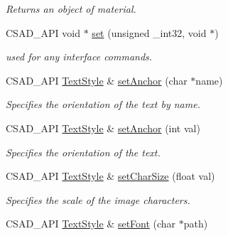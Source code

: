 \begin{DoxyCompactItemize}
\begin{DoxyCompactList}\small\item\em Returns an object of material. \end{DoxyCompactList}\item 
\hypertarget{classcsad_1_1_text_style_aa1f96fcb68ee340eed28c795fd7b0fdd}{C\-S\-A\-D\-\_\-\-A\-P\-I void $\ast$ \hyperlink{classcsad_1_1_text_style_aa1f96fcb68ee340eed28c795fd7b0fdd}{set} (unsigned \-\_\-int32, void $\ast$)}\label{classcsad_1_1_text_style_aa1f96fcb68ee340eed28c795fd7b0fdd}

\begin{DoxyCompactList}\small\item\em used for any interface commands. \end{DoxyCompactList}\item 
\hypertarget{classcsad_1_1_text_style_af16a9581629ca0037478dbaa9a4377c5}{C\-S\-A\-D\-\_\-\-A\-P\-I \hyperlink{classcsad_1_1_text_style}{Text\-Style} \& \hyperlink{classcsad_1_1_text_style_af16a9581629ca0037478dbaa9a4377c5}{set\-Anchor} (char $\ast$name)}\label{classcsad_1_1_text_style_af16a9581629ca0037478dbaa9a4377c5}

\begin{DoxyCompactList}\small\item\em Specifies the orientation of the text by name. \end{DoxyCompactList}\item 
\hypertarget{classcsad_1_1_text_style_a043ba2c648388f8f7269a2a5be9321bb}{C\-S\-A\-D\-\_\-\-A\-P\-I \hyperlink{classcsad_1_1_text_style}{Text\-Style} \& \hyperlink{classcsad_1_1_text_style_a043ba2c648388f8f7269a2a5be9321bb}{set\-Anchor} (int val)}\label{classcsad_1_1_text_style_a043ba2c648388f8f7269a2a5be9321bb}

\begin{DoxyCompactList}\small\item\em Specifies the orientation of the text. \end{DoxyCompactList}\item 
\hypertarget{classcsad_1_1_text_style_a1be6d97cc420d2c798e514d51491045a}{C\-S\-A\-D\-\_\-\-A\-P\-I \hyperlink{classcsad_1_1_text_style}{Text\-Style} \& \hyperlink{classcsad_1_1_text_style_a1be6d97cc420d2c798e514d51491045a}{set\-Char\-Size} (float val)}\label{classcsad_1_1_text_style_a1be6d97cc420d2c798e514d51491045a}

\begin{DoxyCompactList}\small\item\em Specifies the scale of the image characters. \end{DoxyCompactList}\item 
\hypertarget{classcsad_1_1_text_style_acac87e88c6e26886fd4e6a926029659a}{C\-S\-A\-D\-\_\-\-A\-P\-I \hyperlink{classcsad_1_1_text_style}{Text\-Style} \& \hyperlink{classcsad_1_1_text_style_acac87e88c6e26886fd4e6a926029659a}{set\-Font} (char $\ast$path)}\label{classcsad_1_1_text_style_acac87e88c6e26886fd4e6a926029659a}


\end{DoxyCompactItemize}
